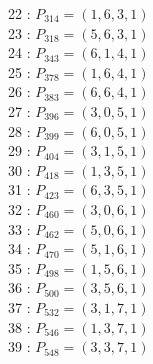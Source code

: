 \documentclass{article}
\begin{document}
{\begin{multicols}{2}
22 : $P_{314}=( 1, 6, 3, 1 )$\\
23 : $P_{318}=( 5, 6, 3, 1 )$\\
24 : $P_{343}=( 6, 1, 4, 1 )$\\
25 : $P_{378}=( 1, 6, 4, 1 )$\\
26 : $P_{383}=( 6, 6, 4, 1 )$\\
27 : $P_{396}=( 3, 0, 5, 1 )$\\
28 : $P_{399}=( 6, 0, 5, 1 )$\\
29 : $P_{404}=( 3, 1, 5, 1 )$\\
30 : $P_{418}=( 1, 3, 5, 1 )$\\
31 : $P_{423}=( 6, 3, 5, 1 )$\\
32 : $P_{460}=( 3, 0, 6, 1 )$\\
33 : $P_{462}=( 5, 0, 6, 1 )$\\
34 : $P_{470}=( 5, 1, 6, 1 )$\\
35 : $P_{498}=( 1, 5, 6, 1 )$\\
36 : $P_{500}=( 3, 5, 6, 1 )$\\
37 : $P_{532}=( 3, 1, 7, 1 )$\\
38 : $P_{546}=( 1, 3, 7, 1 )$\\
39 : $P_{548}=( 3, 3, 7, 1 )$\\
\end{multicols}
}
\end{document}
